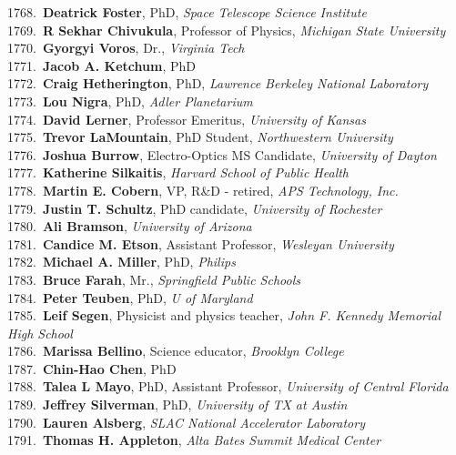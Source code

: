 1768.~{\bf Deatrick Foster}, PhD, {\sl Space Telescope Science Institute} \\
1769.~{\bf R Sekhar Chivukula}, Professor of Physics, {\sl Michigan State University} \\
1770.~{\bf Gyorgyi Voros}, Dr., {\sl Virginia Tech} \\
1771.~{\bf Jacob A. Ketchum}, PhD \\
1772.~{\bf Craig Hetherington}, PhD, {\sl Lawrence Berkeley National Laboratory} \\
1773.~{\bf Lou Nigra}, PhD, {\sl Adler Planetarium} \\
1774.~{\bf David Lerner}, Professor Emeritus, {\sl University of Kansas } \\
1775.~{\bf Trevor LaMountain}, PhD Student, {\sl Northwestern University} \\
1776.~{\bf Joshua Burrow}, Electro-Optics MS Candidate, {\sl University of Dayton} \\
1777.~{\bf Katherine Silkaitis}, {\sl Harvard School of Public Health} \\
1778.~{\bf Martin E. Cobern}, VP, R\&D - retired, {\sl APS Technology, Inc.} \\
1779.~{\bf Justin T. Schultz}, PhD candidate, {\sl University of Rochester} \\
1780.~{\bf Ali Bramson}, {\sl University of Arizona} \\
1781.~{\bf Candice M. Etson}, Assistant Professor, {\sl Wesleyan University} \\
1782.~{\bf Michael A. Miller}, PhD, {\sl Philips} \\
1783.~{\bf Bruce Farah}, Mr., {\sl Springfield Public Schools } \\
1784.~{\bf Peter Teuben}, PhD, {\sl U of Maryland} \\
1785.~{\bf Leif Segen}, Physicist and physics teacher, {\sl John F. Kennedy Memorial High School} \\
1786.~{\bf Marissa Bellino}, Science educator, {\sl Brooklyn College } \\
1787.~{\bf Chin-Hao Chen}, PhD \\
1788.~{\bf Talea L Mayo}, PhD, Assistant Professor, {\sl University of Central Florida} \\
1789.~{\bf Jeffrey Silverman}, PhD, {\sl University of TX at Austin} \\
1790.~{\bf Lauren Alsberg}, {\sl SLAC National Accelerator Laboratory} \\
1791.~{\bf Thomas H. Appleton}, {\sl Alta Bates Summit Medical Center} \\
